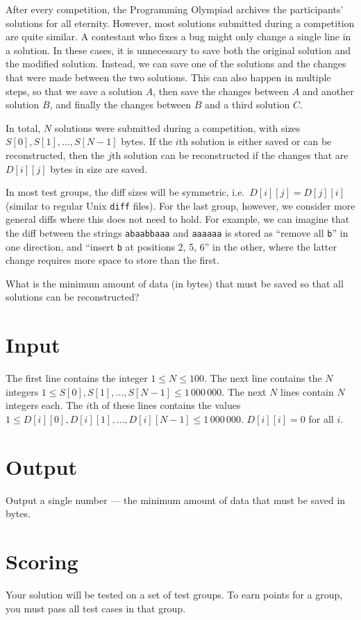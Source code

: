 \def\version{1}
After every competition, the Programming Olympiad archives the participants' solutions for all eternity.
However, most solutions submitted during a competition are quite similar.
A contestant who fixes a bug might only change a single line in a solution.
In these cases, it is unnecessary to save both the original solution and the modified solution.
Instead, we can save one of the solutions and the changes that were made between the two solutions.
This can also happen in multiple steps, so that we save a solution $A$, then save the changes between $A$ and another solution $B$, and finally the changes between $B$ and a third solution $C$.

In total, $N$ solutions were submitted during a competition, with sizes $S[0], S[1], \dots, S[N-1]$ bytes.
If the $i$th solution is either saved or can be reconstructed, then the $j$th solution can be reconstructed if the changes that are $D[i][j]$ bytes in size are saved.

In most test groups, the diff sizes will be symmetric, i.e.\ $D[i][j] = D[j][i]$ (similar to regular Unix \texttt{diff} files).
For the last group, however, we consider more general diffs where this does not need to hold.
For example, we can imagine that the diff between the strings \texttt{abaabbaaa} and \texttt{aaaaaa} is stored as ``remove all \texttt{b}'' in one direction, and ``insert \texttt{b} at positions 2, 5, 6'' in the other, where the latter change requires more space to store than the first.

What is the minimum amount of data (in bytes) that must be saved so that all solutions can be reconstructed?

\section*{Input}
The first line contains the integer $1 \le N \le 100$.
The next line contains the $N$ integers $1 \le S[0], S[1], \dots, S[N-1] \le 1\,000\,000$.
The next $N$ lines contain $N$ integers each.
The $i$th of these lines contains the values $1 \le D[i][0], D[i][1], \dots, D[i][N-1] \le 1\,000\,000$.
$D[i][i] = 0$ for all $i$.

\section*{Output}
Output a single number --- the minimum amount of data that must be saved in bytes.

\section*{Scoring}
Your solution will be tested on a set of test groups. To earn points for a group, you must pass all test cases in that group.

